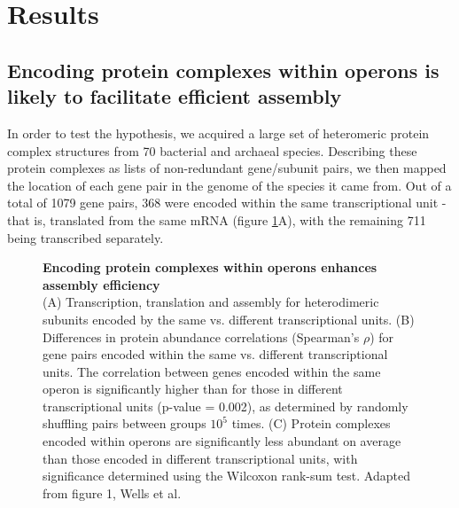 \documentclass[a4paper,11pt,twoside,openright]{scrbook}
\begin{document}
\section{Results}
\subsection{Encoding protein complexes within operons is likely to facilitate efficient assembly}
In order to test the hypothesis, we acquired a large set of heteromeric protein complex structures from 70 bacterial and archaeal species. Describing these protein complexes as lists of non-redundant gene/subunit pairs, we then mapped the location of each gene pair in the genome of the species it came from. Out of a total of 1079 gene pairs, 368 were encoded within the same transcriptional unit - that is, translated from the same mRNA (figure \ref{figure:operonabundance}A), with the remaining 711 being transcribed separately.

\begin{figure}
    \caption[Encoding protein complexes within operons enhances assembly efficiency]{\sffamily \textbf{Encoding protein complexes within operons enhances assembly efficiency} \\ \small (A) Transcription, translation and assembly for heterodimeric subunits encoded by the same vs. different transcriptional units. (B) Differences in protein abundance correlations (Spearman's \(\rho\)) for gene pairs encoded within the same vs. different transcriptional units. The correlation between genes encoded within the same operon is significantly higher than for those in different transcriptional units (p-value = 0.002), as determined by randomly shuffling pairs between groups \(10^{5}\) times. (C) Protein complexes encoded within operons are significantly less abundant on average than those encoded in different transcriptional units, with significance determined using the Wilcoxon rank-sum test. Adapted from figure 1, Wells et al. \cite{Wells2016}}
    \label{figure:operonabundance}
\end{figure}
\end{document}
